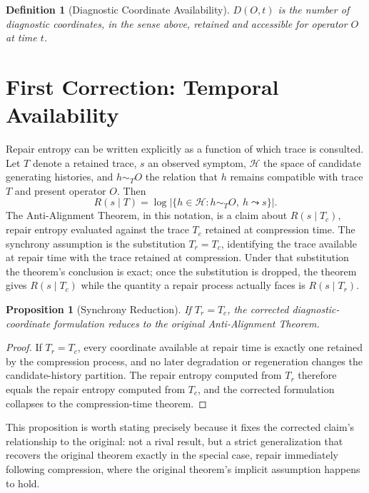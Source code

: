 \documentclass[11pt]{article}
\newtheorem{definition}{Definition}[section]
\newtheorem{proposition}{Proposition}[section]
\begin{document}
\begin{definition}[Diagnostic Coordinate Availability]
$D(O,t)$ is the number of diagnostic coordinates, in the sense above, retained and accessible for operator $O$ at time $t$.
\end{definition}

\section{First Correction: Temporal Availability}

Repair entropy can be written explicitly as a function of which trace is consulted. Let $T$ denote a retained trace, $s$ an observed symptom, $\mathcal{H}$ the space of candidate generating histories, and $h \sim_T O$ the relation that $h$ remains compatible with trace $T$ and present operator $O$. Then
\[
R(s \mid T) = \log \left| \{ h \in \mathcal{H} : h \sim_T O, \ h \leadsto s \} \right|.
\]
The Anti-Alignment Theorem, in this notation, is a claim about $R(s \mid T_c)$, repair entropy evaluated against the trace $T_c$ retained at compression time. The synchrony assumption is the substitution $T_r = T_c$, identifying the trace available at repair time with the trace retained at compression. Under that substitution the theorem's conclusion is exact; once the substitution is dropped, the theorem gives $R(s \mid T_c)$ while the quantity a repair process actually faces is $R(s \mid T_r)$.

\begin{proposition}[Synchrony Reduction]
If $T_r = T_c$, the corrected diagnostic-coordinate formulation reduces to the original Anti-Alignment Theorem.
\end{proposition}

\begin{proof}
If $T_r = T_c$, every coordinate available at repair time is exactly one retained by the compression process, and no later degradation or regeneration changes the candidate-history partition. The repair entropy computed from $T_r$ therefore equals the repair entropy computed from $T_c$, and the corrected formulation collapses to the compression-time theorem.
\end{proof}

This proposition is worth stating precisely because it fixes the corrected claim's relationship to the original: not a rival result, but a strict generalization that recovers the original theorem exactly in the special case, repair immediately following compression, where the original theorem's implicit assumption happens to hold.
\end{document}
